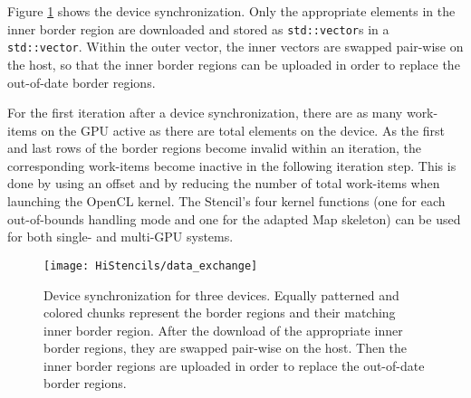 Figure \ref{fig:syncDevices} shows the device synchronization.
Only the appropriate elements in the inner border region are downloaded and stored as \texttt{std::vector}s in a \texttt{std::vector}.
Within the outer vector, the inner vectors are swapped pair-wise on the host, so that the inner border regions can be uploaded in order to replace the out-of-date border regions.

For the first iteration after a device synchronization, there are as many work-items on the GPU active as there are total elements on the device.
As the first and last rows of the border regions become invalid within an iteration, the corresponding work-items become inactive in the following iteration step.
This is done by using an offset and by reducing the number of total work-items when launching the OpenCL kernel.
The Stencil's four kernel functions (one for each out-of-bounds handling mode and one for the adapted Map skeleton) can be used for both single- and multi-GPU systems.
 
\begin{figure}[tb]
	\centering
	\texttt{[image: HiStencils/data\_exchange]}
	\caption{\small Device synchronization for three devices. Equally patterned and colored chunks represent the border regions and their matching inner border region. After the download of the appropriate inner border regions, they are swapped pair-wise on the host. Then the inner border regions are uploaded in order to replace the out-of-date border regions.}
	\label{fig:syncDevices}
  \vspace{1em}
\end{figure} 


